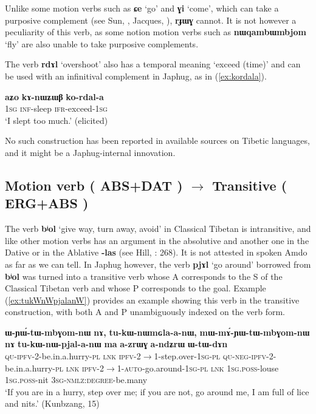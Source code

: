 \documentclass[oneside,a4paper,11pt]{article}
\makeatletter
\newcommand{\ipa}[1]{{\phon\textbf{\mbox{#1}}}} %
\newcommand{\refb}[1]{(\ref{#1})}
\def\fakesc#1{%
  \begingroup%
  \xdef\fake@name{\csname\curr@fontshape/\f@size\endcsname}%
  \fontsize{\fontdimen8\fake@name}{\baselineskip}\selectfont%
  \uppercase{#1}%
  \endgroup%
}
\makeatother
\begin{document}
Unlike some motion verbs such as \ipa{ɕe} `go' and \ipa{ɣi} `come', which can take a purposive complement (see Sun, \citeyear{sun12complementation}, Jacques, \citeyear{jacques13harmonization}), \ipa{rɟɯɣ} cannot. It is not however a peculiarity of this verb, as some notion motion verbs such as \ipa{nɯqambɯmbjom} `fly' are also unable to take purposive complements.

The verb \ipa{rdɤl} `overshoot' also has a temporal meaning `exceed (time)' and can be used with an infinitival complement in Japhug, as in \refb{ex:kordala}.

\begin{exe}
\ex \label{ex:kordala}
\gll
\ipa{aʑo}  	\ipa{kɤ-nɯʑɯβ}  	\ipa{ko-rdal-a}  \\
\textsc{1sg} \textsc{inf}-sleep \textsc{ifr}-exceed-\textsc{1sg} \\
\glt `I slept too much.' (elicited)
\end{exe}

No such construction has been reported in available sources on Tibetic languages, and it might be a Japhug-internal innovation.

\subsection{Motion verb (\fakesc{abs+dat}) $\rightarrow$ Transitive (\fakesc{erg+abs})}  
The verb \ipa{bʲol} `give way, turn away, avoid' in Classical Tibetan is intransitive, and like other motion verbs has an argument in the absolutive and another one in the Dative or in the Ablative \ipa{-las} (see Hill, \citeyear{hill10dictionary}: 268). It is not attested in spoken Amdo as far as we can tell. In Japhug however, the verb \ipa{pjɤl} `go around' borrowed from  \ipa{bʲol} was turned into a transitive verb whose A corresponds to the S of the Classical Tibetan verb and whose P corresponds to the goal. Example \refb{ex:tukWnWpjalanW} provides an example  showing this verb in the transitive construction, with both A and P unambiguously indexed on the verb form.


\begin{exe}
\ex \label{ex:tukWnWpjalanW}
\gll
\ipa{ɯ-ɲɯ́-tɯ-mbɣom-nɯ}  	\ipa{nɤ,}  	\ipa{tu-kɯ-nɯmɢla-a-nɯ,}  \ipa{mɯ-mɤ́-ɲɯ-tɯ-mbɣom-nɯ}  	\ipa{nɤ}  	\ipa{tu-kɯ-nɯ-pjal-a-nɯ}  	\ipa{ma}  	\ipa{a-zrɯɣ}  	\ipa{a-ndʑrɯ}  	\ipa{ɯ-tɯ-dɤn} \\
\textsc{qu-ipfv}-2-be.in.a.hurry-\textsc{pl} \textsc{lnk} \textsc{ipfv}-2$\rightarrow$1-step.over-\textsc{1sg-pl} \textsc{qu-neg-ipfv}-2-be.in.a.hurry-\textsc{pl} \textsc{lnk} \textsc{ipfv}-2$\rightarrow$1-\textsc{auto}-go.around-\textsc{1sg-pl} \textsc{lnk}   \textsc{1sg.poss}-louse \textsc{1sg.poss}-nit \textsc{3sg-nmlz:degree}-be.many \\
\glt `If you are in a hurry, step over me; if you are not, go around me, I am full of lice and nits.' (Kunbzang, 15)
\end{exe}
\end{document}
